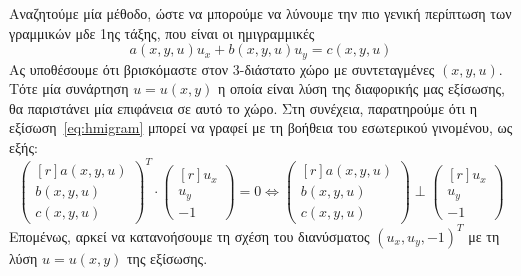 \documentclass[a4paper,table]{report}
\begin{document}
Αναζητούμε μία μέθοδο, ώστε να μπορούμε να λύνουμε την πιο γενική περίπτωση των 
γραμμικών μδε 1ης τάξης, που είναι οι ημιγραμμικές
\begin{equation}\label{eq:hmigram}
  a(x,y,u)u_{x}+b(x,y,u)u_{y}=c(x,y,u) 
\end{equation}
Ας υποθέσουμε ότι βρισκόμαστε στον 3-διάστατο χώρο με συντεταγμένες $ (x,y,u) $. 
Τότε μία συνάρτηση $ u=u(x,y) $ η οποία είναι λύση της διαφορικής μας εξίσωσης, θα 
παριστάνει μία επιφάνεια σε αυτό το χώρο. Στη συνέχεια, παρατηρούμε ότι η
εξίσωση~\eqref{eq:hmigram} μπορεί να γραφεί με τη βοήθεια του εσωτερικού γινομένου, ως
εξής:
\begin{equation}\label{eq:perp}
  \begin{pmatrix*}[r] a(x,y,u) \\ b(x,y,u) \\ c(x,y,u) \end{pmatrix*}^{T} \cdot 
  \begin{pmatrix*}[r] u_{x} \\ u_{y} \\ -1 \end{pmatrix*} = 0 \Leftrightarrow 
  \begin{pmatrix*}[r] a(x,y,u) \\ b(x,y,u) \\ c(x,y,u) \end{pmatrix*} \perp 
  \begin{pmatrix*}[r] u_{x} \\ u_{y} \\ -1 \end{pmatrix*}
\end{equation}
Επομένως, αρκεί να κατανοήσουμε τη σχέση του διανύσματος $ (u_{x},u_{y},-1)^{T} $ 
με τη λύση $ u=u(x,y) $ της εξίσωσης.
\end{document}
